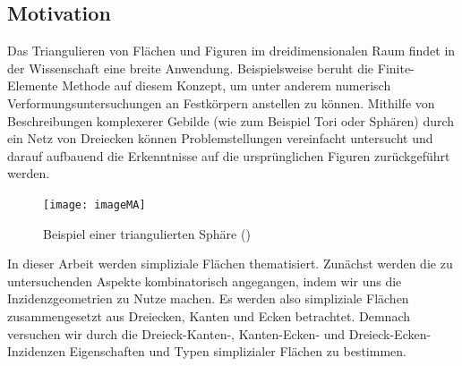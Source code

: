 \documentclass[12pt,titlepage,twoside,cleardoublepage]{article}
\theoremstyle{nummermitklammern}
\numberwithin{equation}{section}
\begin{document}
\subsection{Motivation}
Das Triangulieren von Flächen und Figuren im dreidimensionalen Raum findet in der Wissenschaft eine breite Anwendung. Beispielsweise beruht die Finite-Elemente Methode auf diesem Konzept, um unter anderem numerisch Verformungsuntersuchungen an Festkörpern anstellen zu können. Mithilfe von Beschreibungen komplexerer Gebilde (wie zum Beispiel Tori oder Sphären) durch ein Netz von Dreiecken können Problemstellungen vereinfacht untersucht und darauf aufbauend die Erkenntnisse auf die ursprünglichen Figuren zurückgeführt werden. 
\begin{figure}[H]
\begin{center}
\texttt{[image: imageMA]}
\end{center}
\caption{Beispiel einer triangulierten Sphäre (\cite{pic})}
\end{figure}
In dieser Arbeit werden simpliziale Flächen thematisiert. Zunächst werden die zu untersuchenden Aspekte kombinatorisch angegangen, indem wir uns die Inzidenzgeometrien zu Nutze machen. Es werden also simpliziale Flächen zusammengesetzt aus Dreiecken, Kanten und Ecken betrachtet. Demnach versuchen wir durch die Dreieck-Kanten-, Kanten-Ecken- und Dreieck-Ecken-Inzidenzen Eigenschaften und Typen simplizialer Flächen zu bestimmen. 
\end{document}
